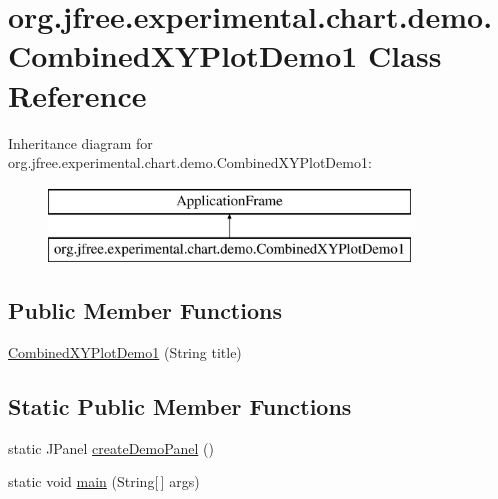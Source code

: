 \hypertarget{classorg_1_1jfree_1_1experimental_1_1chart_1_1demo_1_1_combined_x_y_plot_demo1}{}\section{org.\+jfree.\+experimental.\+chart.\+demo.\+Combined\+X\+Y\+Plot\+Demo1 Class Reference}
\label{classorg_1_1jfree_1_1experimental_1_1chart_1_1demo_1_1_combined_x_y_plot_demo1}
Inheritance diagram for org.\+jfree.\+experimental.\+chart.\+demo.\+Combined\+X\+Y\+Plot\+Demo1\+:\begin{figure}[H]
\begin{center}
\leavevmode
\includegraphics[height=2.000000cm]{classorg_1_1jfree_1_1experimental_1_1chart_1_1demo_1_1_combined_x_y_plot_demo1}
\end{center}
\end{figure}
\subsection*{Public Member Functions}
\begin{DoxyCompactItemize}
\item 
\mbox{\hyperlink{classorg_1_1jfree_1_1experimental_1_1chart_1_1demo_1_1_combined_x_y_plot_demo1_a504cc9035c4e79667a19d7c4d413290d}{Combined\+X\+Y\+Plot\+Demo1}} (String title)
\end{DoxyCompactItemize}
\subsection*{Static Public Member Functions}
\begin{DoxyCompactItemize}
\item 
static J\+Panel \mbox{\hyperlink{classorg_1_1jfree_1_1experimental_1_1chart_1_1demo_1_1_combined_x_y_plot_demo1_a637287ab31c8172a40adf87b6bee20f5}{create\+Demo\+Panel}} ()
\item 
static void \mbox{\hyperlink{classorg_1_1jfree_1_1experimental_1_1chart_1_1demo_1_1_combined_x_y_plot_demo1_ad50250db41e74082bd0c0556191cd92e}{main}} (String\mbox{[}$\,$\mbox{]} args)
\end{DoxyCompactItemize}


